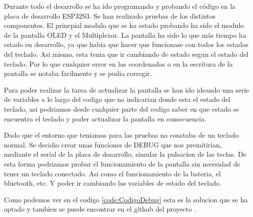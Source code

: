 Durante todo el desarrollo se ha ido programando y probando el código en la placa de desarrollo ESP32S3. Se han realizado pruebas de los distintos componentes. El princpial modulo que se ha estado probando ha sido el modulo de la pantalla \gls{OLED} y el Multiplexor. La pantalla ha sido lo que más tiempo ha estado en desarrollo, ya que habia que hacer que funcionase con todos los estados del teclado. Asi mismo, esta tenia que ir cambiando de estado segun el estado del teclado. Por lo que cualquier error en las coordenadas o en la escritura de la pantalla se notaba facilmente y se podia corregir.

Para poder realizar la tarea de actualizar la pantalla se han ido ideando una serie de variables a lo largo del codigo que no indicarian donde esta el estado del teclado, asi podriamos desde cualquier parte del codigo saber en que estado se encuentra el teclado y poder actualizar la pantalla en consecuencia.

Dado que el entorno que teniamos para las pruebas no constaba de un teclado normal. Se decidio crear unas funciones de DEBUG que nos premitirian, mediante el serial de la placa de desarrollo, simular la pulsacion de las teclas. De esta forma podriamos probar el funcionamiento de la pantalla sin necesidad de tener un teclado conectado. Asi como el funcionamiento de la bateria, el bluetooth, etc. Y poder ir cambiando las variables de estado del teclado.

Como podemos ver en el codigo \ref{code:CodigoDebug} esta es la solucion que se ha optado y tambien se puede encontrar en el github del proyecto \cite{ModernWoodGitHub}. 

